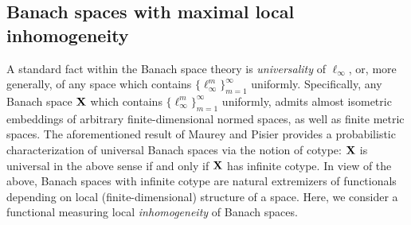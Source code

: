 \documentclass[11pt]{amsart}
\theoremstyle{definition}
\theoremstyle{plain}
\newcommand{\R}{\mathbb{R}}
\def\R{{\mathbb R}}
\begin{document}



\subsection{Banach spaces with maximal local inhomogeneity}
A standard fact within the Banach space theory is {\it universality}
of $\ell_\infty$, or, more generally, of any space
which contains $\{\ell_\infty^m\}_{m=1}^\infty$
uniformly.
Specifically, any Banach space ${\bf X}$ which contains 
$\{\ell_\infty^m\}_{m=1}^\infty$
uniformly, admits almost isometric embeddings of arbitrary 
finite-dimensional normed spaces, as well as finite metric spaces.
The aforementioned result of Maurey and Pisier \cite{MP76}
provides a probabilistic characterization of universal
Banach spaces via the notion of cotype: ${\bf X}$
is universal in the above sense if and only if ${\bf X}$ has infinite cotype.
In view of the above, Banach spaces with infinite cotype
are natural extremizers of functionals depending on
local (finite-dimensional) structure of a space.
Here, we consider a functional
measuring local {\it inhomogeneity}
of Banach spaces.

\smallskip

\end{document}

